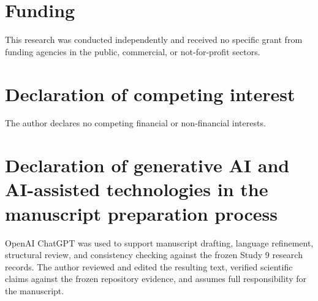 \documentclass[preprint,12pt]{elsarticle}
\begin{document}
\section*{Funding}

This research was conducted independently and received no specific grant from funding agencies in the public, commercial, or not-for-profit sectors.

\section*{Declaration of competing interest}

The author declares no competing financial or non-financial interests.

\section*{Declaration of generative AI and AI-assisted technologies in the manuscript preparation process}

OpenAI ChatGPT was used to support manuscript drafting, language refinement, structural review, and consistency checking against the frozen Study 9 research records. The author reviewed and edited the resulting text, verified scientific claims against the frozen repository evidence, and assumes full responsibility for the manuscript.



\end{document}
